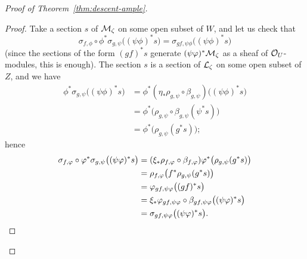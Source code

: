 \begin{4   STACKS}
\begin{4.3 Descent for morphisms of schemes}
\begin{proof}[Proof of Theorem~\ref{thm:descent-ample}]
\begin{proof}
Take a section $s$ of $\cM_{\zeta}$ on some open subset of $W$, and let us check that 
   \[
   \sigma_{f,\phi} \circ \phi^{*}\sigma_{g,\psi} \bigl((\psi\phi)^{*}s\bigr) =
      \sigma_{gf,\psi\phi}\bigl((\psi\phi)^{*}s\bigr)
   \]
(since the sections of the form $(gf)^{*}s$ generate $(\psi\phi)^{*}\cM_{\zeta}$ as a sheaf of $\cO_{U}$-modules, this is enough). The section $s$ is a section of $\cL_{\zeta}$ on some open subset of $Z$, and we have
\begin{align*}
   \phi^{*}\sigma_{g,\psi} \bigl((\psi\phi)^{*}s\bigr) &=
   \phi^{*}(\eta_{*}\rho_{g,\psi} \circ
      \beta_{g,\psi})\bigl((\psi\phi)^{*}s\bigr)\\
   &= \phi^{*}\bigl(\rho_{g,\psi} \circ 
      \beta_{g,\psi}(\psi^{*}s)\bigr)\\
   &= \phi^{*}\bigl(\rho_{g,\psi} (g^{*}s)\bigr);
\end{align*}
hence
   \begin{align*}
   \sigma_{f,\phi} \circ \phi^{*}\sigma_{g,\psi} \bigl((\psi\phi)^{*}s\bigr)
   &= (\xi_{*}\rho_{f,\phi} \circ \beta_{f,\phi})
      \phi^{*}\bigl(\rho_{g,\psi} (g^{*}s)\bigr)\\
   &= \rho_{f,\phi}\bigl(f^{*}\rho_{g,\psi} (g^{*}s)\bigr)\\
   &= \phi_{gf, \psi\phi} \bigl((gf)^{*}s\bigr)\\
   &= \xi_{*}\phi_{gf, \psi\phi} \circ \beta_{gf, \psi\phi} 
      \bigl((\psi\phi)^{*}s\bigr)\\
   &= \sigma_{gf,\psi\phi}\bigl((\psi\phi)^{*}s\bigr).\qedhere
   \end{align*}
\end{proof}



\end{proof}
\end{4.3 Descent for morphisms of schemes}
\end{4   STACKS}
